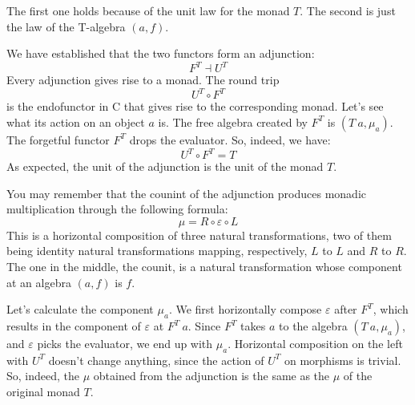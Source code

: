\begin{figure}[H]
  \centering
  \begin{subfigure}
    \centering
  \end{subfigure}%
  \hspace{1cm}
  \begin{subfigure}
    \centering
  \end{subfigure}
\end{figure}

\noindent
The first one holds because of the unit law for the monad $T$.
The second is just the law of the T-algebra $(a, f)$.

We have established that the two functors form an adjunction:
\[F^T \dashv U^T\]
Every adjunction gives rise to a monad. The round trip
\[U^T \circ F^T\]
is the endofunctor in C that gives rise to the corresponding monad.
Let's see what its action on an object $a$ is. The free algebra
created by $F^T$ is $(T\ a, \mu_a)$. The forgetful functor
$F^T$ drops the evaluator. So, indeed, we have:
\[U^T \circ F^T = T\]
As expected, the unit of the adjunction is the unit of the monad $T$.

You may remember that the counint of the adjunction produces monadic
multiplication through the following formula:
\[\mu = R \circ \varepsilon \circ L\]
This is a horizontal composition of three natural transformations, two
of them being identity natural transformations mapping, respectively,
$L$ to $L$ and $R$ to $R$. The one in the
middle, the counit, is a natural transformation whose component at an
algebra $(a, f)$ is $f$.

Let's calculate the component $\mu_a$. We first horizontally compose
$\varepsilon$ after $F^T$, which results in the component of
$\varepsilon$ at $F^T\ a$. Since $F^T$ takes $a$ to the
algebra $(T\ a, \mu_a)$, and $\varepsilon$ picks the evaluator, we end
up with $\mu_a$. Horizontal composition on the left with $U^T$
doesn't change anything, since the action of $U^T$ on morphisms is
trivial. So, indeed, the $\mu$ obtained from the adjunction is the
same as the $\mu$ of the original monad $T$.

